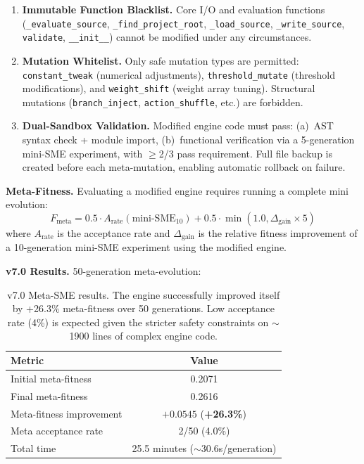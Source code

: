 \documentclass[11pt]{article}
\begin{document}
\begin{enumerate}
    \item \textbf{Immutable Function Blacklist.} Core I/O and evaluation functions (\texttt{\_evaluate\_source}, \texttt{\_find\_project\_root}, \texttt{\_load\_source}, \texttt{\_write\_source}, \texttt{validate}, \texttt{\_\_init\_\_}) cannot be modified under any circumstances.
    
    \item \textbf{Mutation Whitelist.} Only safe mutation types are permitted: \texttt{constant\_tweak} (numerical adjustments), \texttt{threshold\_mutate} (threshold modifications), and \texttt{weight\_shift} (weight array tuning). Structural mutations (\texttt{branch\_inject}, \texttt{action\_shuffle}, etc.) are forbidden.
    
    \item \textbf{Dual-Sandbox Validation.} Modified engine code must pass: (a)~AST syntax check + module import, (b)~functional verification via a 5-generation mini-SME experiment, with $\geq$2/3 pass requirement. Full file backup is created before each meta-mutation, enabling automatic rollback on failure.
\end{enumerate}

\textbf{Meta-Fitness.} Evaluating a modified engine requires running a complete mini evolution:
\begin{equation}
F_{\text{meta}} = 0.5 \cdot A_{\text{rate}}(\text{mini-SME}_{10}) + 0.5 \cdot \min(1.0, \Delta_{\text{gain}} \times 5)
\end{equation}
where $A_{\text{rate}}$ is the acceptance rate and $\Delta_{\text{gain}}$ is the relative fitness improvement of a 10-generation mini-SME experiment using the modified engine.

\textbf{v7.0 Results.} 50-generation meta-evolution:

\begin{table}[h]
\centering
\begin{tabular}{lc}
\toprule
\textbf{Metric} & \textbf{Value} \\
\midrule
Initial meta-fitness & 0.2071 \\
Final meta-fitness & 0.2616 \\
Meta-fitness improvement & $+0.0545$ (\textbf{+26.3\%}) \\
Meta acceptance rate & 2/50 (4.0\%) \\
Total time & 25.5 minutes ($\sim$30.6s/generation) \\
\bottomrule
\end{tabular}
\caption{v7.0 Meta-SME results. The engine successfully improved itself by +26.3\% meta-fitness over 50 generations. Low acceptance rate (4\%) is expected given the stricter safety constraints on $\sim$1900 lines of complex engine code.}
\label{tab:v70_results}
\end{table}
\end{document}
